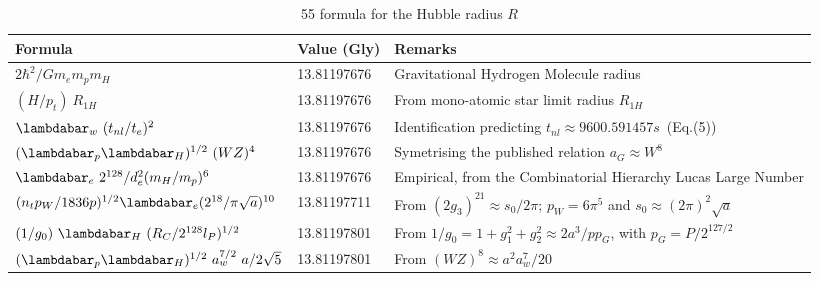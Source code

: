 \documentclass[a4paper,9pt]{article}
\newcounter{col}
\begin{document}
\begin{table}
\caption[Table \ref{tab:6:table6}: 55 Hubble radius formulas]{55 formula for the Hubble radius $R$}
\label{tab:6:table6}
  \hskip-2.0cm\begin{tabular}{lll}
    \toprule
    \cmidrule(r){1-3}
    Formula     & Value (Gly)  & Remarks \\
    \midrule
 
 $ 2\hbar^2/Gm_em_pm_H $ & 13.81197676 & Gravitational Hydrogen Molecule radius \cite{Sanchez2}\\ 
 
 $ (H/p_t)~R_{1H}$ & 13.81197676 & From mono-atomic star limit radius  $R_{1H}$ \cite{Davies} \\
 
 $ \lambdabar_w ~(t_{nl}/t_e)^2$ & 13.81197676 & Identification predicting $t_{nl}\approx 9600.591457 s$~(Eq.(5)) \\
 
 $ (\lambdabar_{p} \lambdabar_{H})^{1/2} ~(WZ)^4$  & 13.81197676 & Symetrising the published relation $a_G \approx W^8$ \cite{Rees} \\
 
 $\lambdabar_{e} ~2^{128}/d_e^2(m_H/m_p)^6$  & 13.81197676   & Empirical, from the Combinatorial Hierarchy Lucas Large Number \cite{Bastin}\\
 
 
  $(n_tp_W/1836p)^{1/2}\lambdabar_{e} (2^{18}/\pi \sqrt a)^{10}$  & 13.81197711   & From $(2g_3)^{21} \approx s_0/2\pi$; $p_W = 6\pi^5$ and $s_0 \approx (2\pi)^2 \sqrt a$\\
 
 
 
  $ (1/g_0) ~\lambdabar_H ~(R_C/2^{128}l_P)^{1/2} $  & 13.81197801 & From $1/g_0 = 1+g_1^2+g_2^2\approx2a^3/pp_G$, with $p_G = P/2^{127/2}$\\ 
 
 
 $ (\lambdabar_{p} \lambdabar_{H})^{1/2}~ a_w^{7/2}~ a/2\sqrt 5 $  & 13.81197801 & From $(WZ)^8 \approx a^2a_w^7/20$\\
 
  

\end{tabular}
\end{table}
\end{document}

